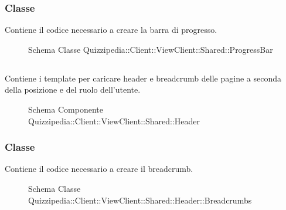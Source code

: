 \subsubsection{Classe }
Contiene il codice necessario a creare la barra di progresso.
\begin{figure}[H]
\centering
\noindent{}
\caption[Schema Classe ProgressBar]{Schema Classe Quizzipedia::Client::ViewClient::Shared::ProgressBar}
\end{figure}
\subsection{}
Contiene i template per caricare header e breadcrumb delle pagine a seconda della posizione e del ruolo dell'utente.
\begin{figure}[H]
\centering
\noindent{}
\caption[Schema Componente Quizzipedia::Client::ViewClient::Shared::Header]{Schema Componente Quizzipedia::Client::ViewClient::Shared::Header}
\end{figure}
\subsubsection{Classe }
Contiene il codice necessario a creare il breadcrumb.
\begin{figure}[H]
\centering
\noindent{}
\caption[Schema Classe Breadcrumbs]{Schema Classe Quizzipedia::Client::ViewClient::Shared::Header::Breadcrumbs}
\end{figure}
